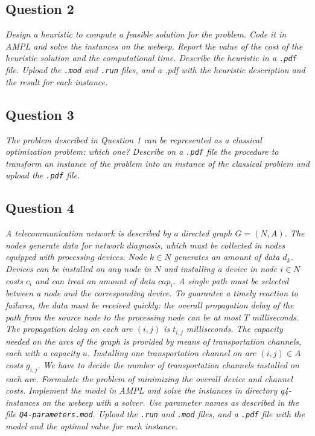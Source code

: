 \documentclass[10pt]{article}
\begin{document}
    \subsection*{Question 2}
    \textit{Design a heuristic to compute a feasible solution for the problem. Code it in AMPL and solve the instances on the webeep. Report the value of the cost of the heuristic solution and the computational time. Describe the heuristic in a \texttt{.pdf} file. Upload the \texttt{.mod} and \texttt{.run} files, and a .pdf with the heuristic description and the result for each instance.}

    \subsection*{Question 3}
    \textit{The problem described in Question 1 can be represented as a classical optimization problem: which one? Describe on a \texttt{.pdf} file the procedure to transform an instance of the problem into an instance of the classical problem and upload the \texttt{.pdf} file.}

    \subsection*{Question 4}
    \textit{A telecommunication network is described by a directed graph $G=(N,A)$. The nodes generate data for network diagnosis, which must be collected in nodes equipped with processing devices. Node $k \in N$ generates an amount of data $d_k$. Devices can be installed on any node in $N$ and installing a device in node $i \in N$ costs $c_i$ and can treat an amount of data $cap_i$. A single path must be selected between a node and the corresponding device. To guarantee a timely reaction to failures, the data must be received quickly: the overall propagation delay of the path from the source node to the processing node can be at most $T$ milliseconds. The propagation delay on each arc $(i,j)$ is $t_{i,j}$ milliseconds. The capacity needed on the arcs of the graph is provided by means of transportation channels, each with a capacity $u$. Installing one transportation channel on arc $(i,j) \in A$ costs $g_{i,j}$. We have to decide the number of transportation channels installed on each arc. Formulate the problem of minimizing the overall device and channel costs. Implement the model in AMPL and solve the instances in directory q4-instances on the webeep with a solver. Use parameter names as described in the file \texttt{Q4-parameters.mod}.  Upload the \texttt{.run} and \texttt{.mod} files, and a \texttt{.pdf} file with the model and the optimal value for each instance.}
\end{document}
